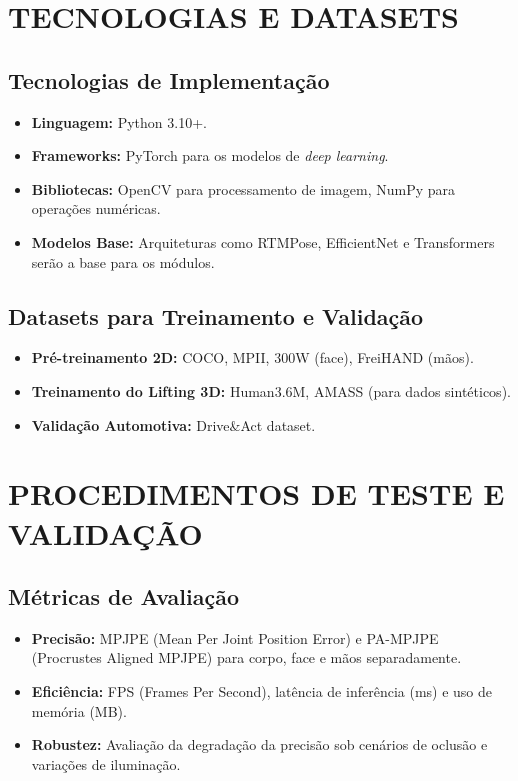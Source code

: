 \documentclass[12pt, a4paper]{article}
\begin{document}
\section{TECNOLOGIAS E DATASETS}

\subsection{Tecnologias de Implementação}
\begin{itemize}
    \item \textbf{Linguagem:} Python 3.10+.
    \item \textbf{Frameworks:} PyTorch para os modelos de \textit{deep learning}.
    \item \textbf{Bibliotecas:} OpenCV para processamento de imagem, NumPy para operações numéricas.
    \item \textbf{Modelos Base:} Arquiteturas como RTMPose, EfficientNet e Transformers serão a base para os módulos.
\end{itemize}

\subsection{Datasets para Treinamento e Validação}
\begin{itemize}
    \item \textbf{Pré-treinamento 2D:} COCO, MPII, 300W (face), FreiHAND (mãos).
    \item \textbf{Treinamento do Lifting 3D:} Human3.6M, AMASS (para dados sintéticos).
    \item \textbf{Validação Automotiva:} Drive\&Act dataset.
\end{itemize}

\section{PROCEDIMENTOS DE TESTE E VALIDAÇÃO}
\subsection{Métricas de Avaliação}
\begin{itemize}
    \item \textbf{Precisão:} MPJPE (Mean Per Joint Position Error) e PA-MPJPE (Procrustes Aligned MPJPE) para corpo, face e mãos separadamente.
    \item \textbf{Eficiência:} FPS (Frames Per Second), latência de inferência (ms) e uso de memória (MB).
    \item \textbf{Robustez:} Avaliação da degradação da precisão sob cenários de oclusão e variações de iluminação.
\end{itemize}
\end{document}
